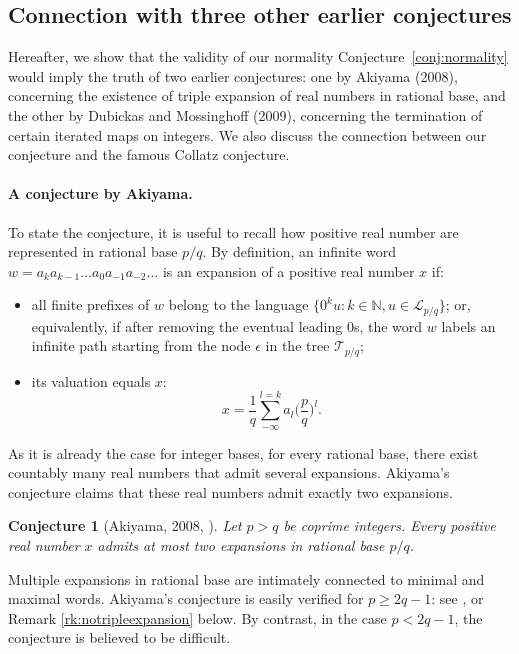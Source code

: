 \documentclass{template_arxiv}
\newtheorem{conjecture}[theorem]{Conjecture}
\numberwithin{equation}{section}
\newcommand{\N}{\mathbb N}
\newcommand{\lan}{\mathcal{L}}
\newcommand{\eps}{\epsilon}
\newcommand{\tree}{\mathcal{T}} %
\begin{document}
\subsection{Connection with three other earlier conjectures}\label{sssect:linkwithconjectures}

Hereafter, we show that the validity of our normality Conjecture~\ref{conj:normality}  would imply the truth of two earlier conjectures: one by Akiyama (2008), concerning the existence of triple expansion of real numbers in rational base, and the other by Dubickas and Mossinghoff (2009), concerning the termination of certain iterated maps on integers.  
We also discuss the connection between our conjecture and the famous Collatz conjecture.

\paragraph{A conjecture by Akiyama.} 
To state the conjecture, it is useful to recall how positive real number are represented in rational base $p/q$. 
By definition, an infinite word $w=a_ka_{k-1}\dots a_0  a_{-1}a_{-2}\dots$ is an expansion of a positive real number $x$ if:
\begin{itemize}
	\vspace{-0.2cm}
	\item[-] all finite prefixes of $w$ belong to the language  $\{0^ku : k \in \N, u \in \lan_{p/q}\}$; or, equivalently, if after removing the eventual leading $0$s, the word $w$ labels an infinite path starting from the node $\eps$ in the tree $\tree_{p/q}$;
	\vspace{-0.2cm}
	\item[-] its valuation equals $x$:
	\[x=\frac{1}{q} \sum\limits_{-\infty}^{l=k} a_{l}\Big(\frac{p}{q}\Big)^{l}.\] 
\end{itemize}

As it is already the case for integer bases, for every rational base, there  exist countably many real numbers that admit several expansions. Akiyama's conjecture claims that these real numbers admit exactly two expansions. 

\begin{conjecture}[Akiyama, 2008, \cite{Aki08}]\label{conj:triple_expansions}
	Let $p>q$ be coprime integers. Every positive real number $x$ admits at most two expansions in rational base $p/q$.
\end{conjecture}

Multiple expansions in rational base are intimately connected to minimal and maximal words. Akiyama's conjecture is easily verified for $p\geq2q-1$: see \cite[Corollary 38]{AFS08}, %
or Remark \ref{rk:notripleexpansion} below. By contrast, in the case $p<2q-1$, the conjecture is believed to be difficult.
\medskip
\end{document}
